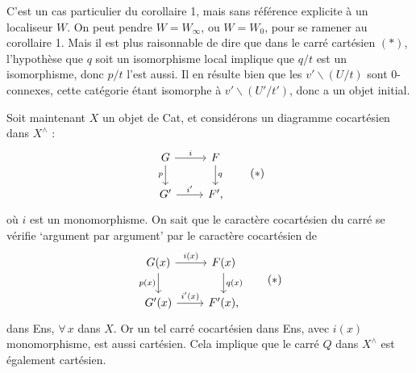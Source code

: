 \documentclass[11pt]{article}
\newcommand{\printedpage}[1]{\marginpar{\footnotesize p.~#1}}
\newcommand{\msp}[1]{\marginpar{\footnotesize [#1]}}
\begin{document}
C'est un cas particulier du corollaire 1, mais sans référence explicite à un localiseur $W$. On peut pendre $W = W_{\infty}$, ou $W = W_0$, pour se ramener au corollaire 1. Mais il est plus raisonnable de dire que dans le carré cartésien $(*)$, l'hypothèse que $q$ soit un isomorphisme local implique que $q/t$ est un isomorphisme, donc $p/t$ l'est aussi. Il en résulte bien que les $v' \backslash (U/t)$ sont 0-connexes, cette catégorie étant isomorphe à $v' \backslash (U'/t')$, donc a un objet initial. %

Soit maintenant $X$ un objet de Cat, et considérons un diagramme cocartésien dans $X^{\wedge}$ :
\[
\begin{tikzcd}
G \ar[r, "i"] \ar[d, "p"'] & F \ar[d, "q"] \\
G' \ar[r, "i'"] & F',
\end{tikzcd}
\tag*{$(*)$}
\]
\printedpage{111}
\msp{page 162}
où $i$ est un monomorphisme. On sait que le caractère cocartésien du carré se vérifie `argument par argument' par le caractère cocartésien de
\[
\begin{tikzcd}
G(x) \ar[r, "i(x)"] \ar[d, "p(x)"'] & F(x) \ar[d, "q(x)"] \\
G'(x) \ar[r, "i'(x)"] & F'(x),
\end{tikzcd}
\tag*{$(*)$}
\]
dans Ens, $\forall\, x$ dans $X$. Or un tel carré cocartésien dans Ens, avec $i(x)$ monomorphisme, est aussi cartésien. Cela implique que le carré $Q$ dans $X^{\wedge}$ est également cartésien.
\end{document}
